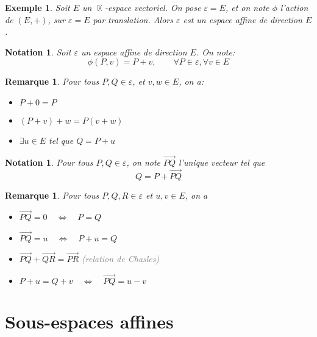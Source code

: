 \documentclass[a4paper, oneside]{report}
\theoremstyle{break}
\newtheorem{notation}[thm]{Notation}
\newtheorem{exemple}[thm]{Exemple}
\newtheorem{remarque}[thm]{Remarque}
\newcommand{\gray}[1]{\textcolor{gray}{#1}}
\DeclareMathOperator{\K}{\mathbb{K}}
\begin{document}
\begin{exemple}
Soit $E$ un $\K$-espace vectoriel. On pose $\varepsilon = E$, et on note $\phi$ l'action de $(E, +)$, sur $\varepsilon = E$ par translation. Alors $\varepsilon$ est un espace affine de direction $E$.
\end{exemple}

\begin{notation}
Soit $\varepsilon$ un espace affine de direction $E$. On note:
\[
\phi(P, v) = P + v,		\qquad	\forall P \in \varepsilon, \forall v \in E
\]
\end{notation}

\begin{remarque}
Pour tous $P, Q \in \varepsilon$, et $v,w \in E$, on a:
\begin{itemize}[label=$\bullet$]
\item $P + 0 = P$

\item $(P + v) + w = P (v + w)$

\item $\exists u \in E$ tel que $Q = P + u$
\end{itemize}
\end{remarque}

\begin{notation}
Pour tous $P, Q \in \varepsilon$, on note $\vec{PQ}$ l'unique vecteur tel que
\[
Q = P + \vec{PQ}
\]
\end{notation}

\begin{remarque}
Pour tous $P, Q, R \in \varepsilon$ et $u, v \in E$, on a
\begin{itemize}[label=$\bullet$]
\item $\vec{PQ} = 0		\quad	\Leftrightarrow	\quad		P = Q$

\item $\vec{PQ} = u		\quad	\Leftrightarrow	\quad		P + u = Q$

\item $\vec{PQ} + \vec{QR} = \vec{PR}$
\newline
\gray{(relation de Chasles)}

\item $P + u = Q + v		\quad	\Leftrightarrow	\quad		\vec{PQ} = u - v$
\end{itemize}
\end{remarque}

\section{Sous-espaces affines}
\end{document}
